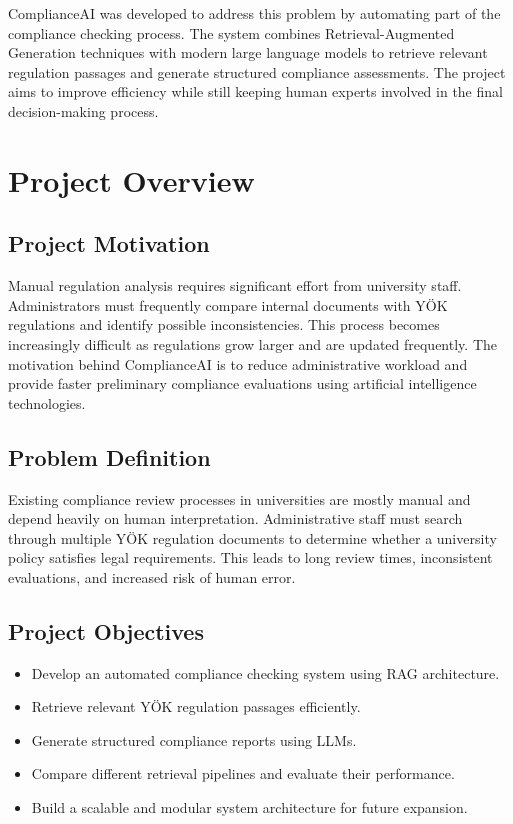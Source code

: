 \documentclass[a4paper,12pt]{article}
\begin{document}
ComplianceAI was developed to address this problem by automating part of the compliance checking process. The system combines Retrieval-Augmented Generation techniques with modern large language models to retrieve relevant regulation passages and generate structured compliance assessments. The project aims to improve efficiency while still keeping human experts involved in the final decision-making process.


\section{Project Overview}

\subsection{Project Motivation}

\hspace{0.5cm} Manual regulation analysis requires significant effort from university staff. Administrators must frequently compare internal documents with YÖK regulations and identify possible inconsistencies. This process becomes increasingly difficult as regulations grow larger and are updated frequently. The motivation behind ComplianceAI is to reduce administrative workload and provide faster preliminary compliance evaluations using artificial intelligence technologies.

\subsection{Problem Definition}

\hspace{0.5cm} Existing compliance review processes in universities are mostly manual and depend heavily on human interpretation. Administrative staff must search through multiple YÖK regulation documents to determine whether a university policy satisfies legal requirements. This leads to long review times, inconsistent evaluations, and increased risk of human error.

\subsection{Project Objectives}

\begin{itemize}[leftmargin=1.2cm]
    \item Develop an automated compliance checking system using RAG architecture.
    \item Retrieve relevant YÖK regulation passages efficiently.
    \item Generate structured compliance reports using LLMs.
    \item Compare different retrieval pipelines and evaluate their performance.
    \item Build a scalable and modular system architecture for future expansion.
\end{itemize}
\end{document}
